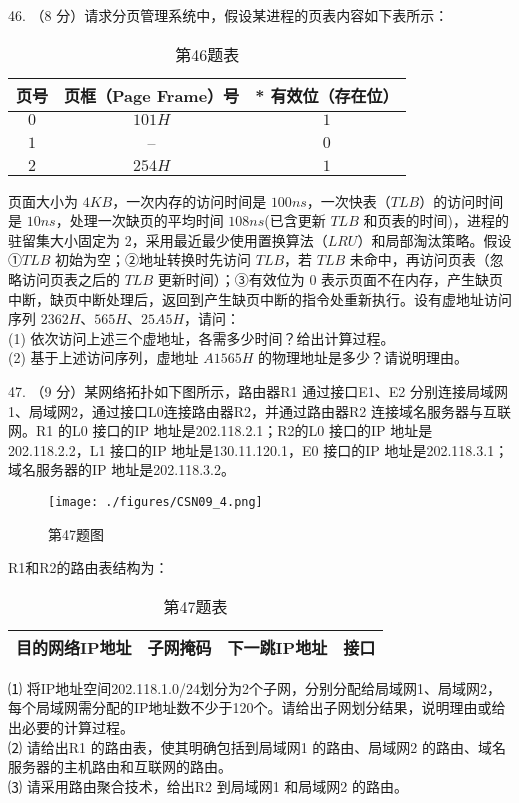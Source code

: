46. （8 分）请求分页管理系统中，假设某进程的页表内容如下表所示：
\begin{table}[ht]
\centering
\caption{第46题表}\label{CSN09_tab3}
\begin{tabular}{|c|c|c|}
\hline
页号 & 页框（Page Frame）号 & * 有效位（存在位） \\
\hline
$0$ & $101H$ & $1$ \\
\hline
$1$ & -- & $0$ \\
\hline
$2$ & $254H$ & $1$ \\
\hline
\end{tabular}
\end{table}
页面大小为 $4KB$，一次内存的访问时间是 $100ns$，一次快表（$TLB$）的访问时间是 $10ns$，处理一次缺页的平均时间 $108ns$(已含更新 $TLB$ 和页表的时间)，进程的驻留集大小固定为 $2$，采用最近最少使用置换算法（$LRU$）和局部淘汰策略。假设①$TLB$ 初始为空；②地址转换时先访问 $TLB$，若 $TLB$ 未命中，再访问页表（忽略访问页表之后的 $TLB$ 更新时间）；③有效位为 $0$ 表示页面不在内存，产生缺页中断，缺页中断处理后，返回到产生缺页中断的指令处重新执行。设有虚地址访问序列 $2362H$、$565H$、$25A5H$，请问： \\
(1) 依次访问上述三个虚地址，各需多少时间？给出计算过程。 \\
(2) 基于上述访问序列，虚地址 $A1565H$ 的物理地址是多少？请说明理由。

47. （9 分）某网络拓扑如下图所示，路由器R1 通过接口E1、E2 分别连接局域网1、局域网2，通过接口L0连接路由器R2，并通过路由器R2 连接域名服务器与互联网。R1 的L0 接口的IP 地址是202.118.2.1；R2的L0 接口的IP 地址是202.118.2.2，L1 接口的IP 地址是130.11.120.1，E0 接口的IP 地址是202.118.3.1；域名服务器的IP 地址是202.118.3.2。
\begin{figure}[ht]
\centering
\texttt{[image: ./figures/CSN09\_4.png]}
\caption{第47题图} \label{CSN09_fig4}
\end{figure}
R1和R2的路由表结构为： \\
\begin{table}[ht]
\centering
\caption{第47题表}\label{CSN09_tab4}
\begin{tabular}{|c|c|c|c|}
\hline
目的网络IP地址 & 子网掩码 & 下一跳IP地址 & 接口 \\
\hline
\end{tabular}
\end{table}
⑴ 将IP地址空间202.118.1.0/24划分为2个子网，分别分配给局域网1、局域网2，每个局域网需分配的IP地址数不少于120个。请给出子网划分结果，说明理由或给出必要的计算过程。 \\
⑵ 请给出R1 的路由表，使其明确包括到局域网1 的路由、局域网2 的路由、域名服务器的主机路由和互联网的路由。 \\
⑶ 请采用路由聚合技术，给出R2 到局域网1 和局域网2 的路由。

